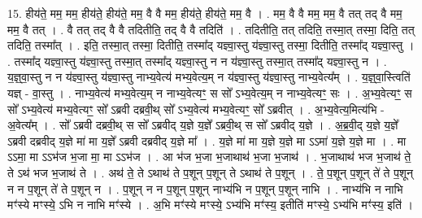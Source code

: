 \documentclass[17pt]{extarticle}
\begin{document}
15. हीय॑ते॒ मम॒ मम॒ हीय॑ते॒ हीय॑ते॒ मम॒ वै वै मम॒ हीय॑ते॒ हीय॑ते॒ मम॒ वै । . मम॒ वै वै मम॒ मम॒ वै तत् तद् वै मम॒ मम॒ वै तत् । . वै तत् तद् वै वै तदितीति॒ तद् वै वै तदिति॑ । . तदितीति॒ तत् तदिति॒ तस्मा॒त् तस्मा॒ दिति॒ तत् तदिति॒ तस्मा᳚त् । . इति॒ तस्मा॒त् तस्मा॒ दितीति॒ तस्मा᳚द् यज्ञ्वा॒स्तु य॑ज्ञ्वा॒स्तु तस्मा॒ दितीति॒ तस्मा᳚द् यज्ञ्वा॒स्तु । . तस्मा᳚द् यज्ञ्वा॒स्तु य॑ज्ञ्वा॒स्तु तस्मा॒त् तस्मा᳚द् यज्ञ्वा॒स्तु न न य॑ज्ञ्वा॒स्तु तस्मा॒त् तस्मा᳚द् यज्ञ्वा॒स्तु न । . य॒ज्ञ्॒वा॒स्तु न न य॑ज्ञ्वा॒स्तु य॑ज्ञ्वा॒स्तु नाभ्य॒वेत्य॑ मभ्य॒वेत्य॒म् न य॑ज्ञ्वा॒स्तु य॑ज्ञ्वा॒स्तु नाभ्य॒वेत्य᳚म् । . य॒ज्ञ्॒वा॒स्त्विति॑ यज्ञ् - वा॒स्तु । . नाभ्य॒वेत्य॑ मभ्य॒वेत्य॒म् न नाभ्य॒वेत्यꣳ॒॒ स सो᳚ ऽभ्य॒वेत्य॒म् न नाभ्य॒वेत्यꣳ॒॒ सः । . अ॒भ्य॒वेत्यꣳ॒॒ स सो᳚ ऽभ्य॒वेत्य॑ मभ्य॒वेत्यꣳ॒॒ सो᳚ ऽब्रवी दब्रवी॒थ् सो᳚ ऽभ्य॒वेत्य॑ मभ्य॒वेत्यꣳ॒॒ सो᳚ ऽब्रवीत् । . अ॒भ्य॒वेत्य॒मित्य॑भि - अ॒वेत्य᳚म् । . सो᳚ ऽब्रवी दब्रवी॒थ् स सो᳚ ऽब्रवीद् य॒ज्ञे य॒ज्ञे᳚ ऽब्रवी॒थ् स सो᳚ ऽब्रवीद् य॒ज्ञे । . अ॒ब्र॒वी॒द् य॒ज्ञे य॒ज्ञे᳚ ऽब्रवी दब्रवीद् य॒ज्ञे मा॑ मा य॒ज्ञे᳚ ऽब्रवी दब्रवीद् य॒ज्ञे मा᳚ । . य॒ज्ञे मा॑ मा य॒ज्ञे य॒ज्ञे मा ऽऽमा॑ य॒ज्ञे य॒ज्ञे मा । . मा ऽऽमा॒ मा ऽऽभ॑ज भ॒जा मा॒ मा ऽऽभ॑ज । . आ भ॑ज भ॒जा भ॒जाथाथ॑ भ॒जा भ॒जाथ॑ । . भ॒जाथाथ॑ भज भ॒जाथ॑ ते॒ ते ऽथ॑ भज भ॒जाथ॑ ते । . अथ॑ ते॒ ते ऽथाथ॑ ते प॒शून् प॒शून् ते ऽथाथ॑ ते प॒शून् । . ते॒ प॒शून् प॒शून् ते॑ ते प॒शून् न न प॒शून् ते॑ ते प॒शून् न । . प॒शून् न न प॒शून् प॒शून् नाभ्य॑भि न प॒शून् प॒शून् नाभि । . नाभ्य॑भि न नाभि मꣳ॑स्ये मꣳस्ये॒ ऽभि न नाभि मꣳ॑स्ये । . अ॒भि मꣳ॑स्ये मꣳस्ये॒ ऽभ्य॑भि मꣳ॑स्य॒ इतीति॑ मꣳस्ये॒ ऽभ्य॑भि मꣳ॑स्य॒ इति॑ । \newline
\end{document}
